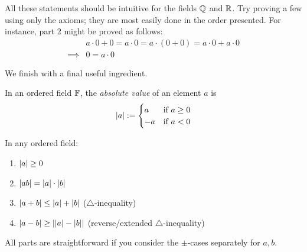 All these statements should be intuitive for the fields $\mathbb{Q}$ and $\mathbb{R}$. Try proving a few using only the axioms; they are most easily done in the order presented. For instance, part 2 might be proved as follows:
\begin{align*}
	&a\cdot 0+0=a\cdot 0=a\cdot(0+0)=a\cdot 0+a\cdot 0 \tag{additive identity/distibutive axioms}\\
	\implies &0=a\cdot 0 \tag{part 1}
\end{align*}

We finish with a final useful ingredient.

\begin{defn}{}{}
	In an ordered field $\mathbb{F}$, the \emph{absolute value} of an element $a$ is
	\[
		\left| a\right|:=
		\begin{cases}
			a&\text{if }a\ge 0\\
			-a&\text{if }a<0
		\end{cases}
	\]
\end{defn}

\begin{thm}{}{}
	In any ordered field:
	\begin{enumerate}
	\item $\left| a\right|\ge 0$
	\item $\left| ab\right|=\left| a\right|\cdot \left| b\right|$
	\item $\left| a+b\right|\le \left| a\right|+\left| b\right|$ \lstsp ($\triangle$-inequality)
	\item $\left| a-b\right|\ge \left| \left| a\right|-\left| b\right|\right|$ \lstsp (reverse/extended $\triangle$-inequality)
	\end{enumerate}
\end{thm}

All parts are straightforward if you consider the $\pm$-cases separately for $a,b$.


